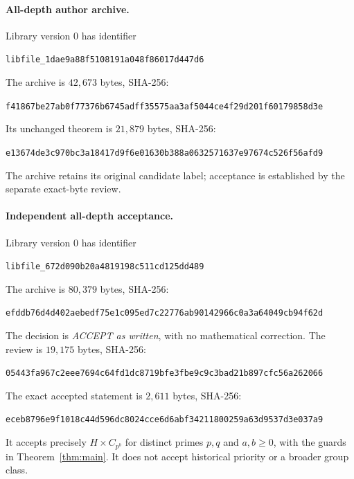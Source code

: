 \documentclass[11pt,letterpaper]{article}
\theoremstyle{definition}\newtheorem{definition}{Definition}
\newcommand{\hash}[1]{{\small\ttfamily\nolinkurl{#1}}}
\begin{document}
\paragraph{All-depth author archive.}
Library version 0 has identifier\begin{center}\hash{libfile_1dae9a88f5108191a048f86017d447d6}\end{center}The archive is $42{,}673$ bytes, SHA-256:
\begin{center}\hash{f41867be27ab0f77376b6745adff35575aa3af5044ce4f29d201f60179858d3e}\end{center}
Its unchanged theorem is $21{,}879$ bytes, SHA-256:
\begin{center}\hash{e13674de3c970bc3a18417d9f6e01630b388a0632571637e97674c526f56afd9}\end{center}
The archive retains its original candidate label; acceptance is established by the separate exact-byte review.

\paragraph{Independent all-depth acceptance.}
Library version 0 has identifier\begin{center}\hash{libfile_672d090b20a4819198c511cd125dd489}\end{center}The archive is $80{,}379$ bytes, SHA-256:
\begin{center}\hash{efddb76d4d402aebedf75e1c095ed7c22776ab90142966c0a3a64049cb94f62d}\end{center}
The decision is \emph{ACCEPT as written}, with no mathematical correction. The review is $19{,}175$ bytes, SHA-256:
\begin{center}\hash{05443fa967c2eee7694c64fd1dc8719bfe3fbe9c9c3bad21b897cfc56a262066}\end{center}
The exact accepted statement is $2{,}611$ bytes, SHA-256:
\begin{center}\hash{eceb8796e9f1018c44d596dc8024cce6d6abf34211800259a63d9537d3e037a9}\end{center}
It accepts precisely $H\times C_{p^b}$ for distinct primes $p,q$ and $a,b\ge0$, with the guards in Theorem~\ref{thm:main}. It does not accept historical priority or a broader group class.
\end{document}
